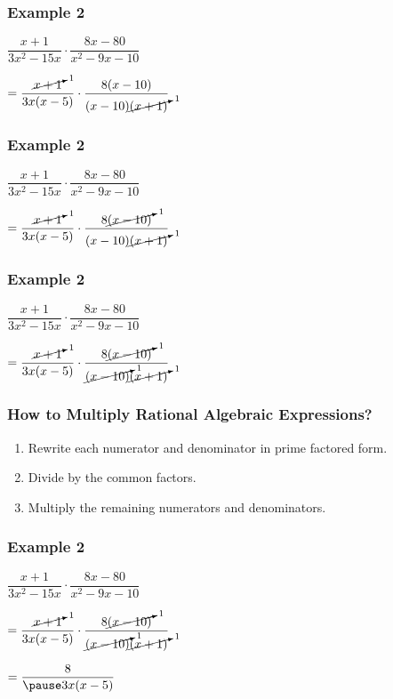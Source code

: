 \documentclass[14pt]{beamer}
\begin{document}
     \begin{frame}
     	\frametitle{Example 2}
     	$\dfrac{x + 1}{3x^2 - 15x} \cdot \dfrac{8x -80}{x^2 - 9x - 10}$ 
     	
     	\vspace{1em} $= \dfrac{\cancelto{1}{x + 1}}{ 3x(x -5)} \cdot \dfrac{8 (x -10)}{ (x -10)\cancelto{1}{(x + 1)}}$
     \end{frame}
 
     \begin{frame}
     	\frametitle{Example 2}
     	$\dfrac{x + 1}{3x^2 - 15x} \cdot \dfrac{8x -80}{x^2 - 9x - 10}$ 
     	
     	\vspace{1em} $= \dfrac{\cancelto{1}{x + 1}}{ 3x(x -5)} \cdot \dfrac{8 \cancelto{1}{(x -10)}}{ (x -10)\cancelto{1}{(x + 1)}}$
     \end{frame}
  
      \begin{frame}
      	\frametitle{Example 2}
      	$\dfrac{x + 1}{3x^2 - 15x} \cdot \dfrac{8x -80}{x^2 - 9x - 10}$ 
      	
      	\vspace{1em} $= \dfrac{\cancelto{1}{x + 1}}{ 3x(x -5)} \cdot \dfrac{8 \cancelto{1}{(x -10)}}{ \cancelto{1}{(x -10)}\cancelto{1}{(x + 1)}}$
      \end{frame}
 
 \begin{frame}
 	\frametitle{How to Multiply Rational Algebraic Expressions?}
 	\begin{enumerate}
 		\item Rewrite each numerator and denominator in prime factored form.
 		\item Divide by the common factors.
 		\item Multiply the remaining numerators and denominators.
 	\end{enumerate}
 \end{frame}
 
     \begin{frame}
     	\frametitle{Example 2}
     	$\dfrac{x + 1}{3x^2 - 15x} \cdot \dfrac{8x -80}{x^2 - 9x - 10}$ 
     	
     	\vspace{1em} $= \dfrac{\cancelto{1}{x + 1}}{ 3x(x -5)} \cdot \dfrac{8 \cancelto{1}{(x -10)}}{ \cancelto{1}{(x -10)}\cancelto{1}{(x + 1)}}$
     	
     	\pause \vspace{1em} $= \dfrac{8}{\pause 3x(x -5)}$
     \end{frame}
\end{document}
